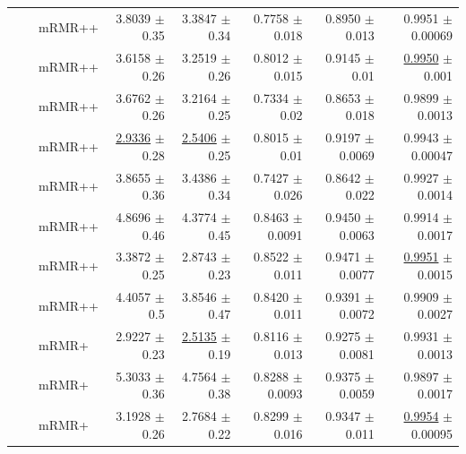 \begin{longtable}{llp{}rrrrr}
 &  & mRMR++ & 3.8039 {\scriptsize $\pm$ 0.35} & 3.3847 {\scriptsize $\pm$ 0.34} & 0.7758 {\scriptsize $\pm$ 0.018} & 0.8950 {\scriptsize $\pm$ 0.013} & 0.9951 {\scriptsize $\pm$ 0.00069} \\
 &  & mRMR++ & 3.6158 {\scriptsize $\pm$ 0.26} & 3.2519 {\scriptsize $\pm$ 0.26} & 0.8012 {\scriptsize $\pm$ 0.015} & 0.9145 {\scriptsize $\pm$ 0.01} & \underline{0.9950} {\scriptsize $\pm$ 0.001} \\
 &  & mRMR++ & 3.6762 {\scriptsize $\pm$ 0.26} & 3.2164 {\scriptsize $\pm$ 0.25} & 0.7334 {\scriptsize $\pm$ 0.02} & 0.8653 {\scriptsize $\pm$ 0.018} & 0.9899 {\scriptsize $\pm$ 0.0013} \\
 &  & mRMR++ & \underline{2.9336} {\scriptsize $\pm$ 0.28} & \underline{2.5406} {\scriptsize $\pm$ 0.25} & 0.8015 {\scriptsize $\pm$ 0.01} & 0.9197 {\scriptsize $\pm$ 0.0069} & 0.9943 {\scriptsize $\pm$ 0.00047} \\
 &  & mRMR++ & 3.8655 {\scriptsize $\pm$ 0.36} & 3.4386 {\scriptsize $\pm$ 0.34} & 0.7427 {\scriptsize $\pm$ 0.026} & 0.8642 {\scriptsize $\pm$ 0.022} & 0.9927 {\scriptsize $\pm$ 0.0014} \\
 &  & mRMR++ & 4.8696 {\scriptsize $\pm$ 0.46} & 4.3774 {\scriptsize $\pm$ 0.45} & 0.8463 {\scriptsize $\pm$ 0.0091} & 0.9450 {\scriptsize $\pm$ 0.0063} & 0.9914 {\scriptsize $\pm$ 0.0017} \\
 &  & mRMR++ & 3.3872 {\scriptsize $\pm$ 0.25} & 2.8743 {\scriptsize $\pm$ 0.23} & 0.8522 {\scriptsize $\pm$ 0.011} & 0.9471 {\scriptsize $\pm$ 0.0077} & \underline{0.9951} {\scriptsize $\pm$ 0.0015} \\
 &  & mRMR++ & 4.4057 {\scriptsize $\pm$ 0.5} & 3.8546 {\scriptsize $\pm$ 0.47} & 0.8420 {\scriptsize $\pm$ 0.011} & 0.9391 {\scriptsize $\pm$ 0.0072} & 0.9909 {\scriptsize $\pm$ 0.0027} \\
 &  & mRMR+ & 2.9227 {\scriptsize $\pm$ 0.23} & \underline{2.5135} {\scriptsize $\pm$ 0.19} & 0.8116 {\scriptsize $\pm$ 0.013} & 0.9275 {\scriptsize $\pm$ 0.0081} & 0.9931 {\scriptsize $\pm$ 0.0013} \\
 &  & mRMR+ & 5.3033 {\scriptsize $\pm$ 0.36} & 4.7564 {\scriptsize $\pm$ 0.38} & 0.8288 {\scriptsize $\pm$ 0.0093} & 0.9375 {\scriptsize $\pm$ 0.0059} & 0.9897 {\scriptsize $\pm$ 0.0017} \\
 &  & mRMR+ & 3.1928 {\scriptsize $\pm$ 0.26} & 2.7684 {\scriptsize $\pm$ 0.22} & 0.8299 {\scriptsize $\pm$ 0.016} & 0.9347 {\scriptsize $\pm$ 0.011} & \underline{0.9954} {\scriptsize $\pm$ 0.00095} \\

\end{longtable}
